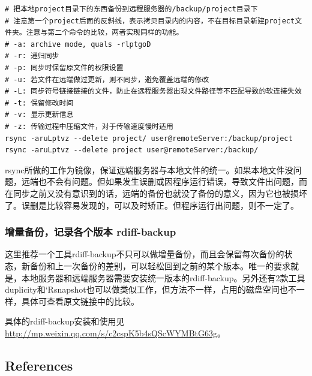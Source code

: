 \documentclass[]{article}
\numberwithin{figure}{section}
\numberwithin{table}{section}
\begin{document}
\begin{verbatim}
# 把本地project目录下的东西备份到远程服务器的/backup/project目录下
# 注意第一个project后面的反斜线，表示拷贝目录内的内容，不在目标目录新建project文件夹。注意与第二个命令的比较，两者实现同样的功能。
# -a: archive mode, quals -rlptgoD
# -r: 递归同步
# -p: 同步时保留原文件的权限设置
# -u: 若文件在远端做过更新，则不同步，避免覆盖远端的修改
# -L: 同步符号链接链接的文件，防止在远程服务器出现文件路径等不匹配导致的软连接失效
# -t: 保留修改时间
# -v: 显示更新信息
# -z: 传输过程中压缩文件，对于传输速度慢时适用
rsync -aruLptvz --delete project/ user@remoteServer:/backup/project
rsync -aruLptvz --delete project user@remoteServer:/backup/
\end{verbatim}

rsync所做的工作为镜像，保证远端服务器与本地文件的统一。如果本地文件没问题，远端也不会有问题。但如果发生误删或因程序运行错误，导致文件出问题，而在同步之前又没有意识到的话，远端的备份也就没了备份的意义，因为它也被损坏了。误删是比较容易发现的，可以及时矫正。但程序运行出问题，则不一定了。

\hypertarget{rdiff_backup}{%
\subsubsection{增量备份，记录各个版本 rdiff-backup}\label{rdiff_backup}}

这里推荐一个工具rdiff-backup不只可以做增量备份，而且会保留每次备份的状态，新备份和上一次备份的差别，可以轻松回到之前的某个版本。唯一的要求就是，本地服务器和远端服务器需要安装统一版本的rdiff-backup。另外还有2款工具 duplicity和`Rsnapshot也可以做类似工作，但方法不一样，占用的磁盘空间也不一样，具体可查看原文链接中的比较。

具体的rdiff-backup安装和使用见\url{http://mp.weixin.qq.com/s/c2cspK5b4sQScWYMBtG63g}。

\hypertarget{references}{%
\subsection{References}\label{references}}
\end{document}
